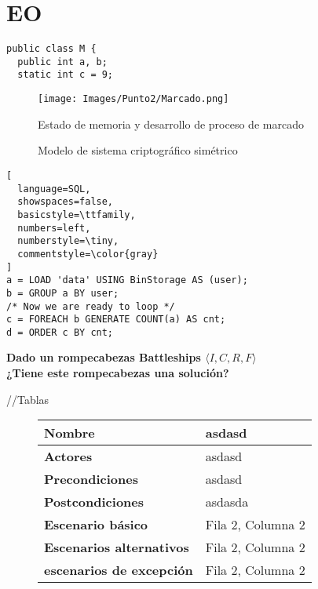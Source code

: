\section{EO}
\begin{lstlisting}[style=java,caption= Metodo ordenarPorConteoChar]
  public class M { 
  public int a, b;
  static int c = 9; 
 \end{lstlisting}

 \begin{figure}[!htb]
  \centering
  \texttt{[image: Images/Punto2/Marcado.png]}
  \caption{Estado de memoria y desarrollo de proceso de marcado}
  \label{fig:marcado}
\end{figure}


\begin{figure}[!htb]
    \centering

    
    \caption{Modelo de sistema criptográfico simétrico}
\end{figure}


 \begin{lstlisting}[
  language=SQL,
  showspaces=false,
  basicstyle=\ttfamily,
  numbers=left,
  numberstyle=\tiny,
  commentstyle=\color{gray}
]
a = LOAD 'data' USING BinStorage AS (user);
b = GROUP a BY user;
/* Now we are ready to loop */
c = FOREACH b GENERATE COUNT(a) AS cnt;
d = ORDER c BY cnt;
\end{lstlisting}


\begin{tcolorbox}
  \begin{center}
   \textbf{Dado un rompecabezas Battleships $\langle I, C, R, F\rangle$ \\ ¿Tiene este rompecabezas una solución?}
  \end{center}
\end{tcolorbox}


//Tablas
\begin{figure}[htb]
  \centering
  \scriptsize %
  \small
  \begin{tabular}{| p{4.5 cm} | p{12 cm} |}
  \hline
  \textbf{Nombre} & asdasd \\
  \hline
  \textbf{Actores}  & asdasd \\
  \hline
  \textbf{Precondiciones} & asdasd \\
  \hline
  \textbf{Postcondiciones} & asdasda \\
  \hline
  \textbf{Escenario básico} & Fila 2, Columna 2 \\
  \hline
  \textbf{Escenarios alternativos} & Fila 2, Columna 2 \\
  \hline
  \textbf{escenarios de excepción} & Fila 2, Columna 2 \\
  \hline
  \end{tabular}
\end{figure}